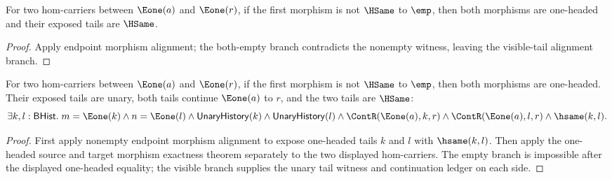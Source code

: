 \begin{theorem}\label{thm:category-e1-source-e1-target-nonempty-morphism-alignment}
For two hom-carriers between $\Eone(a)$ and $\Eone(r)$, if the first morphism is not $\HSame$ to $\emp$, then both morphisms are one-headed and their exposed tails are $\HSame$.
\end{theorem}
\begin{proof} Apply endpoint morphism alignment; the both-empty branch contradicts the nonempty witness, leaving the visible-tail alignment branch.
\end{proof}

\begin{theorem}
\label{thm:category-e1-source-e1-target-nonempty-morphism-tail-cont-alignment}
For two hom-carriers between $\Eone(a)$ and $\Eone(r)$, if the first morphism
is not $\HSame$ to $\emp$, then both morphisms are one-headed. Their exposed
tails are unary, both tails continue $\Eone(a)$ to $r$, and the two tails are
$\HSame$:
$$
\exists k,l:\mathsf{BHist}.\;
m=\Eone(k)\land n=\Eone(l)\land
\mathsf{UnaryHistory}(k)\land\mathsf{UnaryHistory}(l)\land
\ContR(\Eone(a),k,r)\land\ContR(\Eone(a),l,r)\land\hsame(k,l).
$$
\end{theorem}
\begin{proof}
First apply nonempty endpoint morphism alignment to expose one-headed tails
$k$ and $l$ with $\hsame(k,l)$. Then apply the one-headed source and target
morphism exactness theorem separately to the two displayed hom-carriers. The
empty branch is impossible after the displayed one-headed equality; the
visible branch supplies the unary tail witness and continuation ledger on each
side.
\end{proof}

